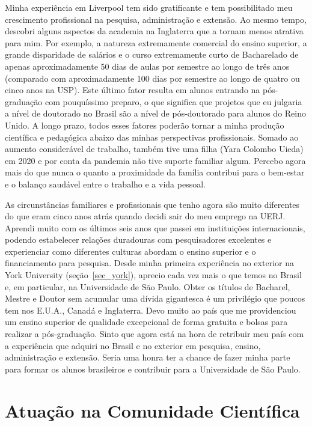 \documentclass[10pt,a4paper,oneside]{book}
\begin{document}
Minha experiência em Liverpool tem sido gratificante e tem possibilitado meu
crescimento profissional na pesquisa, administração e extensão.
Ao mesmo tempo, descobri alguns aspectos da academia na Inglaterra que a tornam
menos atrativa para mim.
Por exemplo, a natureza extremamente comercial do ensino superior,  a grande
disparidade de salários e o curso extremamente curto de Bacharelado de apenas
aproximadamente 50 dias de aulas por semestre ao longo de três anos (comparado
com aproximadamente 100 dias por semestre ao longo de quatro ou cinco anos na
USP).
Este último fator resulta em alunos entrando na pós-graduação com pouquíssimo
preparo, o que significa que projetos que eu julgaria a nível de doutorado no
Brasil são a nível de pós-doutorado para alunos do Reino Unido.
A longo prazo, todos esses fatores poderão tornar a minha produção científica e
pedagógica abaixo das minhas perspectivas profissionais.
Somado ao aumento considerável de trabalho, também tive uma filha (Yara Colombo
Uieda) em 2020 e por conta da pandemia não tive suporte familiar algum.
Percebo agora mais do que nunca o quanto a proximidade da família contribui
para o bem-estar e o balanço saudável entre o trabalho e a vida pessoal.

As circunstâncias familiares e profissionais que tenho agora são muito
diferentes do que eram cinco anos atrás quando decidi sair do meu emprego na
UERJ.
Aprendi muito com os últimos seis anos que passei em instituições
internacionais, podendo estabelecer relações duradouras com pesquisadores
excelentes e experienciar como diferentes culturas abordam o ensino superior e
o financiamento para pesquisa.
Desde minha primeira experiência no exterior na York University
(seção~\ref{sec_york}), aprecio cada vez mais o que temos no Brasil e, em
particular, na Universidade de São Paulo.
Obter os títulos de Bacharel, Mestre e Doutor sem acumular uma dívida
gigantesca é um privilégio que poucos tem nos E.U.A., Canadá e Inglaterra.
Devo muito ao país que me providenciou um ensino superior de qualidade
excepcional de forma gratuita e bolsas para realizar a pós-graduação.
Sinto que agora está na hora de retribuir meu país com a experiência que
adquiri no Brasil e no exterior em pesquisa, ensino, administração e extensão.
Seria uma honra ter a chance de fazer minha parte para formar os alunos
brasileiros e contribuir para a Universidade de São Paulo.


\section{Atuação na Comunidade Científica}
\label{sec_comunidade}
\end{document}
